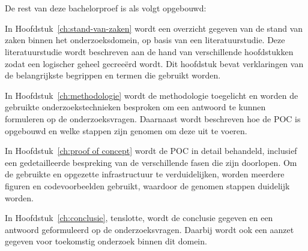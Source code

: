 \section{}%
\label{sec:opzet-bachelorproef}


De rest van deze bachelorproef is als volgt opgebouwd:

In Hoofdstuk~\ref{ch:stand-van-zaken} wordt een overzicht gegeven van de stand van zaken binnen het onderzoeksdomein, op basis van een literatuurstudie. Deze literatuurstudie wordt beschreven aan de hand van verschillende hoofdstukken zodat een logischer geheel gecreeërd wordt. Dit hoofdstuk bevat verklaringen van de belangrijkste begrippen en termen die gebruikt worden.

In Hoofdstuk~\ref{ch:methodologie} wordt de methodologie toegelicht en worden de gebruikte onderzoekstechnieken besproken om een antwoord te kunnen formuleren op de onderzoeksvragen. Daarnaast wordt beschreven hoe de POC is opgebouwd en welke stappen zijn genomen om deze uit te voeren.

In Hoofdstuk~\ref{ch:proof of concept} wordt de POC in detail behandeld, inclusief een gedetailleerde bespreking van de verschillende fasen die zijn doorlopen. Om de gebruikte en opgezette infrastructuur te verduidelijken, worden meerdere figuren en codevoorbeelden gebruikt, waardoor de genomen stappen duidelijk worden.

In Hoofdstuk~\ref{ch:conclusie}, tenslotte, wordt de conclusie gegeven en een antwoord geformuleerd op de onderzoeksvragen. Daarbij wordt ook een aanzet gegeven voor toekomstig onderzoek binnen dit domein.
